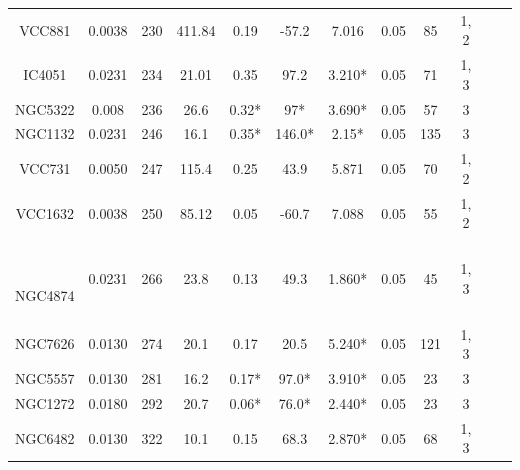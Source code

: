 \begin{table}
\begin{tabular}{c c c c c c c c c c c c}
			VCC881 & 0.0038 & 230 & 411.84 & 0.19 & -57.2 & 7.016 & 0.05 & 85 & 1, 2\\
			
			IC4051 & 0.0231 & 234 & 21.01 & 0.35 & 97.2 & 3.210* & 0.05 & 71 & 1, 3\\
			
			NGC5322 & 0.008 & 236 & 26.6 & 0.32* & 97* & 3.690* & 0.05 & 57 & 3\\
			
			NGC1132 & 0.0231 & 246 & 16.1 & 0.35* & 146.0* & 2.15* & 0.05 & 135 & 3\\
			
			VCC731 & 0.0050 & 247 & 115.4 & 0.25 & 43.9 & 5.871 & 0.05 & 70 & 1, 2\\
			
			VCC1632 & 0.0038 & 250 & 85.12 & 0.05 & -60.7 & 7.088 & 0.05 & 55 & 1, 2\\\
			
			NGC4874 & 0.0231 & 266 & 23.8 & 0.13 & 49.3 & 1.860* & 0.05 & 45 & 1, 3\\
			
			NGC7626 & 0.0130 & 274 & 20.1 & 0.17 & 20.5 & 5.240* & 0.05 & 121 & 1, 3\\
			
			NGC5557 & 0.0130 & 281 & 16.2 & 0.17* & 97.0* & 3.910* & 0.05 & 23 & 3\\
			
			NGC1272 & 0.0180 & 292 & 20.7 & 0.06* & 76.0* & 2.440* & 0.05 & 23 & 3\\
			
			NGC6482 & 0.0130 & 322 & 10.1 & 0.15 & 68.3 & 2.870* & 0.05 & 68 & 1, 3\\
			\hline
			
	\end{tabular}
	\label{table:gal_list}
\end{table} 

